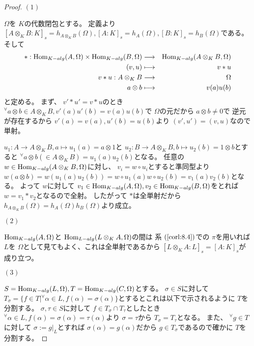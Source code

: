 \documentclass[../master_galois_theory]{subfiles}
\begin{document}
\begin{proof}
  $(1)$

  $\Omega$を $K$の代数閉包とする。
  定義より $[A \otimes_K B:K]_s = h_{A \otimes_K B}(\Omega) ,
  [A:K]_s = h_A(\Omega) , [B:K]_s = h_B(\Omega)$である。
  そして
  \begin{eqnarray*}
    * :  \mathrm{Hom}_{K-alg}(A , \Omega) \times \mathrm{Hom}_{K-alg}(B , \Omega)
     & \longrightarrow &  \mathrm{Hom}_{K-alg}(A \otimes_K B , \Omega) \\
     (v , u) & \longmapsto & v * u \\
     v * u : A \otimes_K B & \longrightarrow & \Omega \\
     a \otimes b & \longmapsto & v(a) u(b)
  \end{eqnarray*}
  と定める。
  まず、 $v' * u' = v * u$のとき ${}^\forall a \otimes b \in A \otimes_K B , v'(a) u'(b) = v(a) u(b)$で $\Omega$の元だから $a \otimes b \neq 0$で
  逆元が存在するから $v'(a) = v(a) , u'(b) = u(b)$より $(v',u') = (v,u)$なので単射。

  $u_1 : A \longrightarrow A \otimes_K B , a \longmapsto u_1(a) = a \otimes 1$と
  $u_2 : B \longrightarrow A \otimes_K B , b \longmapsto u_2(b) = 1 \otimes b$とすると
  ${}^\forall a \otimes b (\in A \otimes_K B) = u_1(a) u_2(b)$となる。
  任意の $w \in \mathrm{Hom}_{K-alg}(A \otimes_K B , \Omega)$に対し、
  $v_i = w \circ u_i$とすると準同型より
  $w(a \otimes b) = w(u_1(a) u_2(b)) = w \circ u_1(a) w \circ u_2(b) = v_1(a) v_2(b)$となる。
  よって $w$に対して $v_1 \in \mathrm{Hom}_{K-alg}(A,\Omega) , v_2 \in \mathrm{Hom}_{K-alg}(B,\Omega)$をとれば $w = v_1 * v_2$となるので全射。
  したがって $*$は全単射だから $h_{A \otimes_K B}(\Omega) = h_A(\Omega) h_B(\Omega)$より成立。

  $(2)$

  $\mathrm{Hom}_{K-alg}(A,\Omega)$と $\mathrm{Hom}_{L-alg}(L \otimes_K A , \Omega)$の間は
  系 $(\mathrm{\ref{corl:8.4}})$での $\pi$を用いれば
  $L$を $\Omega$として見てもよく、これは全単射であるから
  $[L \otimes_K A : L]_s = [A:K]_s$が成り立つ。

  $(3)$

  $S = \mathrm{Hom}_{K-alg}(L,\Omega) , T = \mathrm{Hom}_{K-alg}(C,\Omega)$とする。
  $\sigma \in S$に対して $T_\sigma = \{ f \in T | {}^\forall \alpha \in L , f(\alpha) = \sigma(\alpha) \}$とするとこれは以下で示されるように $T$を分割する。
  $\sigma , \tau \in S$に対して $f \in T_\sigma \cap T_\tau$としたとき
  ${}^\forall \alpha \in L , f(\alpha) = \sigma(\alpha) = \tau(\alpha)$より
  $\sigma = \tau$から $T_\sigma = T_\tau$となる。
  また、 ${}^\forall g \in T$に対して
  $\sigma := g|_L$とすれば $\sigma(\alpha) = g(\alpha)$だから
  $g \in T_\sigma$であるので確かに $T$を分割する。


\end{proof}
\end{document}
